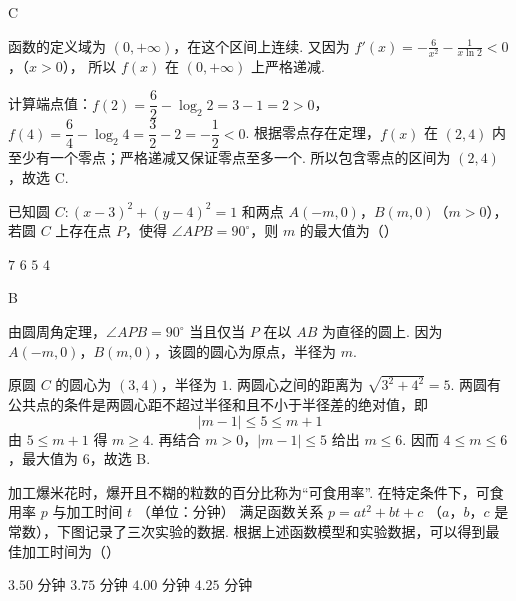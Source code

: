 \begin{answer}
C
\end{answer}

\begin{solution}
函数的定义域为 \((0,+\infty)\)，在这个区间上连续. 又因为
\(f'(x)=-\frac{6}{x^2}-\frac{1}{x\ln 2}<0\)，（\(x>0\)），
所以 \(f(x)\) 在 \((0,+\infty)\) 上严格递减.

计算端点值：\(f(2)=\dfrac{6}{2}-\log_2 2=3-1=2>0\)，\(f(4)=\dfrac{6}{4}-\log_2 4=\dfrac32-2=-\dfrac12<0\). 根据零点存在定理，\(f(x)\) 在 \((2,4)\) 内至少有一个零点；严格递减又保证零点至多一个. 所以包含零点的区间为 \((2,4)\)，故选 C.
\end{solution}

\begin{problem}
已知圆 \(C: (x - 3)^2 + (y - 4)^2 = 1\) 和两点 \(A(-m, 0)\)，\(B(m, 0)\)（\(m > 0\)），若圆 \(C\) 上存在点 \(P\)，使得 \(\angle APB = 90^\circ\)，则 \(m\) 的最大值为（\quad）

\choices
    {\(7\)}
    {\(6\)}
    {\(5\)}
    {\(4\)}
\end{problem}

\begin{answer}
B
\end{answer}

\begin{solution}
由圆周角定理，\(\angle APB=90^\circ\) 当且仅当 \(P\) 在以 \(AB\) 为直径的圆上. 因为 \(A(-m,0)\)，\(B(m,0)\)，该圆的圆心为原点，半径为 \(m\).

原圆 \(C\) 的圆心为 \((3,4)\)，半径为 \(1\). 两圆心之间的距离为 \(\sqrt{3^2+4^2}=5\). 两圆有公共点的条件是两圆心距不超过半径和且不小于半径差的绝对值，即
\[
|m-1|\leqslant5\leqslant m+1
\]
由 \(5\leqslant m+1\) 得 \(m\geqslant4\). 再结合 \(m>0\)，\(|m-1|\leqslant5\) 给出 \(m\leqslant6\). 因而 \(4\leqslant m\leqslant6\)，最大值为 \(6\)，故选 B.
\end{solution}

\begin{problem}
加工爆米花时，爆开且不糊的粒数的百分比称为“可食用率”. 在特定条件下，可食用率 \( p \) 与加工时间 \( t \) （单位：分钟） 满足函数关系 \( p = at^2 + bt + c \) （\(a\)，\(b\)，\(c\) 是常数），下图记录了三次实验的数据. 根据上述函数模型和实验数据，可以得到最佳加工时间为（\quad）


\choices
    {\(3.50\text{ 分钟}\)}
    {\(3.75\text{ 分钟}\)}
    {\(4.00\text{ 分钟}\)}
    {\(4.25\text{ 分钟}\)}
\end{problem}

